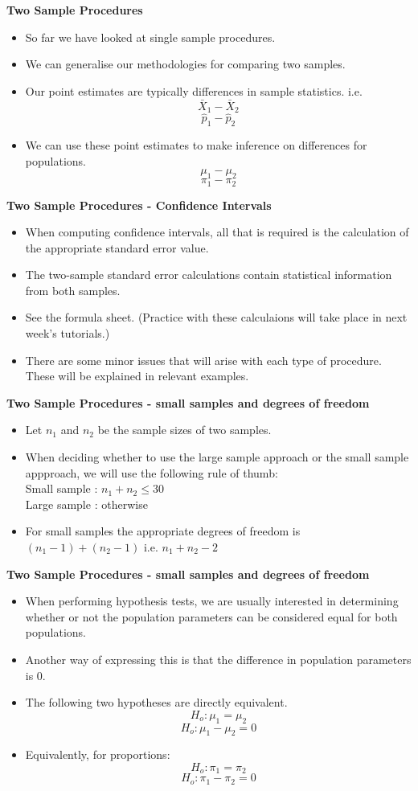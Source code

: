 
\textbf{Two Sample Procedures}
\begin{itemize}
\item So far we have looked at single sample procedures.
\item We can generalise our methodologies for comparing two samples.
\item Our point estimates are typically differences in sample statistics. i.e.
\[ \bar{X}_1 - \bar{X}_2\]
\[\hat{p}_1 - \hat{p}_2 \]
\item We can use these point estimates to make inference on differences for populations.
\[ \mu_1 - \mu_2\]
\[ \pi_1 - \pi_2 \]
\end{itemize}


\noindent \textbf{Two Sample Procedures - Confidence Intervals}
\begin{itemize}
\item When computing confidence intervals, all that is required is the calculation of the appropriate standard error value.
\item The two-sample standard error calculations contain statistical information from both samples.
\item See the formula sheet. (Practice with these calculaions will take place in next week's tutorials.)
\item There are some minor issues that will arise with each type of procedure. These will be explained in relevant examples.
\end{itemize}


\noindent \textbf{Two Sample Procedures - small samples and degrees of freedom}
\begin{itemize}
\item Let $n_1$ and $n_2$ be the sample sizes of two samples.
\item When deciding whether to use the large sample approach or the small sample appproach, we will use the following rule of thumb: \\
Small sample : $n_1+n_2 \leq 30$\\
Large sample : otherwise\\
\item For small samples the appropriate degrees of freedom is $(n_1-1) + (n_2-1)$ i.e. $n_1 + n_2-2$ 
\end{itemize}


\textbf{Two Sample Procedures - small samples and degrees of freedom}
\begin{itemize}
\item When performing hypothesis tests, we are usually interested in determining whether or not the population parameters can be considered equal for both populations.
\item Another way of expressing this is that the difference in population parameters is 0. 
\item The following two hypotheses are directly equivalent.
\[ H_o :  \mu_1 = \mu_2\]
\[ H_o :  \mu_1 - \mu_2 =0\]
\item Equivalently, for proportions:
\[ H_o :  \pi_1 = \pi_2\]
\[ H_o :  \pi_1 - \pi_2 =0\]
\end{itemize}


